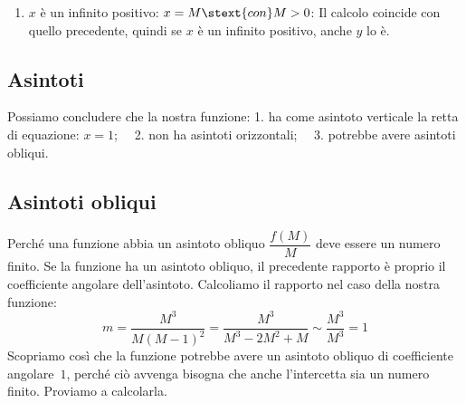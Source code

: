 \begin{enumerate} 
\item \(x\) è un infinito positivo: \(x = M \stext{con} M > 0\):
Il calcolo coincide con quello precedente,
quindi se \(x\) è un infinito positivo, anche \(y\) lo è.
\end{enumerate}
\vspace{.5em}
\subsection{Asintoti}

Possiamo concludere che la nostra funzione: 
1. ha come asintoto verticale la retta di equazione: \(x=1\);~~
2. non ha asintoti orizzontali;~~
3. potrebbe avere asintoti obliqui.


\subsection{Asintoti obliqui}

Perché una funzione abbia un asintoto obliquo \(\dfrac{f(M)}{M}\) 
deve essere un numero finito. 
Se la funzione ha un asintoto obliquo, il precedente rapporto è proprio il 
coefficiente angolare dell'asintoto. 
Calcoliamo il rapporto nel caso della nostra funzione:
\[m=\frac{M^3}{M(M-1)^2} = \frac{M^3}{M^3 -2M^2 +M} \sim \frac{M^3}{M^3} = 1\]
Scopriamo così che la funzione potrebbe avere un asintoto obliquo di 
coefficiente angolare~\(1\), perché ciò avvenga bisogna che anche 
l'intercetta sia un numero finito. 
Proviamo a calcolarla.

